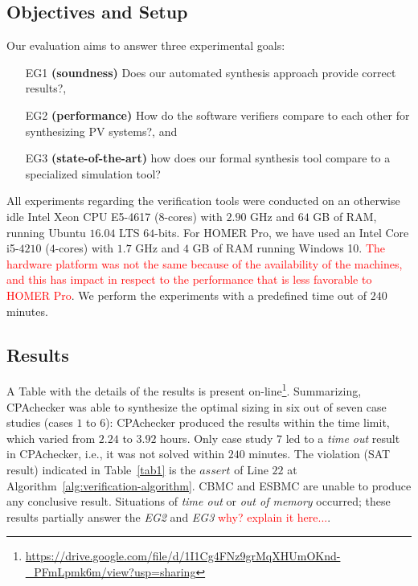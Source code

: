 \documentclass[runningheads]{llncs}
\begin{document}
\subsection{Objectives and Setup}

Our evaluation aims to answer three experimental goals: 
\begin{enumerate}
\item[EG1] \textbf{(soundness)} Does our automated synthesis approach provide correct results?, 
\item[EG2] \textbf{(performance)} How do the software verifiers compare to each other for synthesizing PV systems?, and 
\item[EG3] \textbf{(state-of-the-art)} how does our formal synthesis tool compare to a specialized simulation tool?
\end{enumerate}


All experiments regarding the verification tools were conducted on an otherwise idle Intel Xeon CPU E5-4617 ($8$-cores) with $2.90$ GHz and $64$ GB of RAM, running Ubuntu $16.04$ LTS $64$-bits. For HOMER Pro, we have used an Intel Core i5-$4210$ ($4$-cores) with $1.7$ GHz and $4$ GB of RAM running Windows 10. \textcolor{red}{The hardware platform was not the same because of the availability of the machines, and this has impact in respect to the performance that is less favorable to HOMER Pro}. We perform the experiments with a predefined time out of $240$ minutes.

\subsection{Results}

A Table with the details of the results is present on-line\footnote{\url{https://drive.google.com/file/d/1I1Cg4FNz9grMqXHUmOKnd-\_PFmLpmk6m/view?usp=sharing}}. Summarizing,  CPAchecker was able to synthesize the optimal sizing in six out of seven case studies (cases $1$ to $6$): CPAchecker produced the results within the time limit, which varied from $2.24$ to $3.92$ hours. Only case study $7$ led to a \textit{time out} result in CPAchecker, i.e., it was not solved within $240$ minutes. The violation (SAT result) indicated in Table~\ref{tab1} is the $assert$ of Line $22$ at Algorithm~\ref{alg:verification-algorithm}. CBMC and ESBMC are unable to produce any conclusive result. Situations of \textit{time out} or \textit{out of memory} occurred; these results partially answer the \textit{EG2} and \textit{EG3} \textcolor{red}{why? explain it here...}. 
\end{document}

